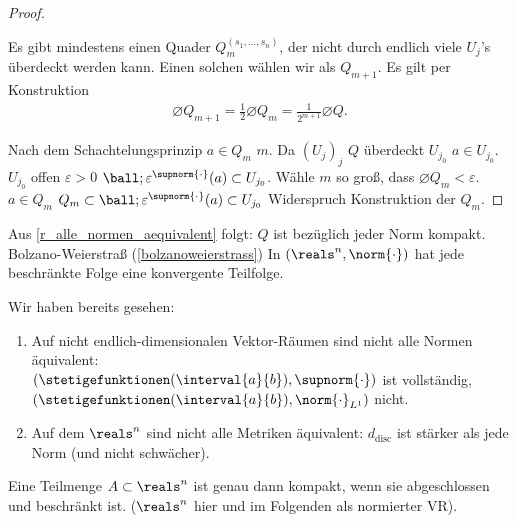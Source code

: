 \begin{proof}
\begin{figure}[H]
        \label{fig:teilquader}
    \end{figure}
    Es gibt mindestens einen Quader \( Q_m^{(s_1,\dotsc,s_n)} \), der nicht durch endlich viele \( U_j \)'s überdeckt werden kann. Einen solchen wählen wir als \( Q_{m+1} \). Es gilt per Konstruktion
    \begin{align*}
        \diameter{Q_{m+1}}=\frac{1}{2}\diameter{Q_m}=\frac{1}{2^{m+1}}\diameter{Q}.
    \end{align*}
    
    Nach dem Schachtelungsprinzip \texists \( a\in Q_m \) \tforall \( m \). Da \( (U_j)_j \) \( Q \) überdeckt \texists \( U_{j_0} \) \sd \( a\in U_{j_0} \). \( U_{j_0} \) offen \timplies \texists \( \varepsilon>0 \) \sd \( \ball;{\varepsilon}^{\supnorm{\cdot}}(a)\subset U_{j_0} \). Wähle \( m \) so groß, dass \( \diameter{Q_m}<\varepsilon \). \( a\in Q_m \) \timplies \( Q_m\subset \ball;{\varepsilon}^{\supnorm{\cdot}}(a)\subset U_{j_0} \) \contra Widerspruch Konstruktion der \( Q_m \).
\end{proof}
\begin{bemerkung}
    Aus \ref{r_alle_normen_aequivalent} folgt: \( Q \) ist bezüglich jeder Norm kompakt. Bolzano-Weierstraß (\ref{bolzanoweierstrass}) \timplies In \( (\reals^n,\norm{\cdot}) \) hat jede beschränkte Folge eine konvergente Teilfolge.
\end{bemerkung}
\begin{bemerkungen}
    Wir haben bereits gesehen:
    \begin{enumerate}
        \item Auf nicht endlich-dimensionalen Vektor-Räumen sind nicht alle Normen äquivalent:\\
        \( (\stetigefunktionen(\interval{a}{b}), \supnorm{\cdot}) \) ist vollständig, \( (\stetigefunktionen(\interval{a}{b}), \norm{\cdot}_{L^1}) \) nicht.
        \item Auf dem \( \reals^n \) sind nicht alle Metriken äquivalent: \( d_{\text{disc}} \) ist stärker als jede Norm (und nicht schwächer).
    \end{enumerate}
\end{bemerkungen}
\begin{satz}\label{heineborel} 
    Eine Teilmenge \( A\subset \reals^n \) ist genau dann kompakt, wenn sie abgeschlossen und beschränkt ist. (\( \reals^n \) hier und im Folgenden als normierter VR). 
\end{satz}
